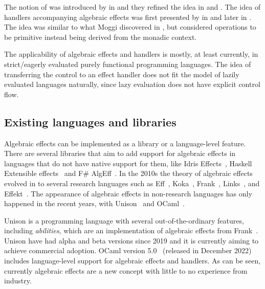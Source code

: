 The notion of  was introduced by \textcite{adequacy-for-alg-effs} in \citeyear{adequacy-for-alg-effs} and they refined the idea in \cite{comp-effs-and-ops} and \cite{alg-ops-gen-effs}. The idea of handlers accompanying algebraic effects was first presented by \textcite{handlers-of-alg-effs} in \citeyear{handlers-of-alg-effs} and later \textcite{handling-alg-effs} in \citeyear{handling-alg-effs}. The idea was similar to what Moggi discovered in \cite{notions-computations}, but \citeauthor{adequacy-for-alg-effs} considered operations to be primitive instead being derived from the monadic context.

The applicability of algebraic effects and handlers is mostly, at least currently, in strict/eagerly evaluated purely functional programming languages. The idea of transferring the control to an effect handler does not fit the model of lazily evaluated languages naturally, since lazy evaluation does not have explicit control flow.~\cite{alg-effs-for-fp}


\subsection{Existing languages and libraries}
Algebraic effects can be implemented as a library or a language-level feature. There are several libraries that aim to add support for algebraic effects in languages that do not have native support for them, like Idris Effects~\cite{idris-effects}, Haskell Extensible effects~\cite{extensible-effects} and F\# AlgEff~\cite{fsharp-alg-eff}. In the 2010s the theory of algebraic effects evolved in to several research languages such as Eff~\cite{eff-lang}, Koka~\cite{koka-lang}, Frank~\cite{frank-lang}, Links~\cite{links-lang}, and Effekt~\cite{effekt-lang}. The appearance of algebraic effects in non-research languages has only happened in the recent years, with Unison~\cite{unison-lang} and OCaml~\cite{ocaml-lang}.

Unison is a programming language with several out-of-the-ordinary features, including \emph{abilities}, which are an implementation of algebraic effects from Frank~\cite{frank-lang}. Unison have had alpha and beta versions since 2019 and it is currently aiming to achieve commercial adoption. OCaml version 5.0~\cite{ocaml-v5} (released in December 2022) includes language-level support for algebraic effects and handlers. As can be seen, currently algebraic effects are a new concept with little to no experience from industry.


